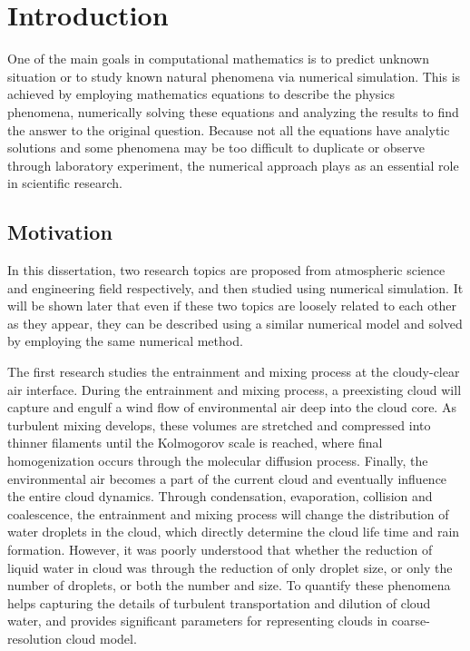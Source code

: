 \chapter{Introduction}
One of the main goals in computational mathematics is to predict unknown situation or 
to study known natural phenomena via numerical simulation. This is achieved by employing 
mathematics equations to describe the physics phenomena, numerically solving these 
equations and analyzing the results to find the answer to the original question. 
Because not all the equations have analytic solutions and some phenomena may be too 
difficult to duplicate or observe through laboratory experiment, the numerical approach 
plays as an essential role in scientific research.

\section{Motivation}
In this dissertation, two research topics are proposed from atmospheric science and 
engineering field respectively, and then studied using numerical simulation. 
It will be shown later that even if these two topics are loosely related to each other 
as they appear, they can be described using a similar numerical model and solved by
employing the same numerical method.

The first research studies the entrainment and mixing process at the cloudy-clear air interface. 
During the entrainment and mixing process, a preexisting cloud will capture and engulf a wind flow 
of environmental air deep into the cloud core. As turbulent mixing develops, these volumes are 
stretched and compressed into thinner filaments until the Kolmogorov scale is reached, where final 
homogenization occurs through the molecular diffusion process. Finally, the environmental air becomes a 
part of the current cloud and eventually influence the entire cloud dynamics. Through condensation, 
evaporation, collision and coalescence, the entrainment and mixing process will change the distribution 
of water droplets in the cloud, which directly determine the cloud life time and rain formation. 
However, it was poorly understood that whether the reduction of liquid water in cloud 
was through the reduction of only droplet size, or only the number of droplets, or both the number 
and size. To quantify these phenomena helps capturing the details of turbulent transportation and 
dilution of cloud water, and provides significant parameters for representing clouds in coarse-resolution 
cloud model.

